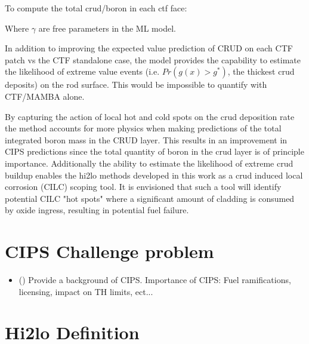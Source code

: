 To compute the total crud/boron in each ctf face:
\\

\begin{algorithm}[H]

\end{algorithm}
Where $\gamma$ are free parameters in the ML model.
\bigskip

In addition to improving the expected value prediction of CRUD on each CTF patch vs the CTF standalone case, the model provides the capability to estimate the likelihood of extreme value events (i.e. $Pr(g(x) > g^*)$, the thickest crud deposits) on the rod surface.  This would be impossible to quantify with CTF/MAMBA alone.

By capturing the action of local hot and cold spots on the crud deposition rate the method accounts for more physics when making predictions of the total integrated boron mass in the CRUD layer.  This results in an improvement in CIPS predictions since the total quantity of boron in the crud layer is of principle importance.  Additionally the ability to estimate the likelihood of extreme crud buildup enables the hi2lo methods developed in this work as a crud induced local corrosion (CILC) scoping tool.  It is envisioned that such a tool will identify potential CILC "hot spots" where a significant amount of cladding is consumed by oxide ingress, resulting in potential fuel failure.


\section{CIPS Challenge problem}

\begin{itemize}
    \item (\checkmark) Provide a background of CIPS.  Importance of CIPS:  Fuel ramifications, licensing, impact on TH limits, ect...
\end{itemize}


\section{Hi2lo Definition}

